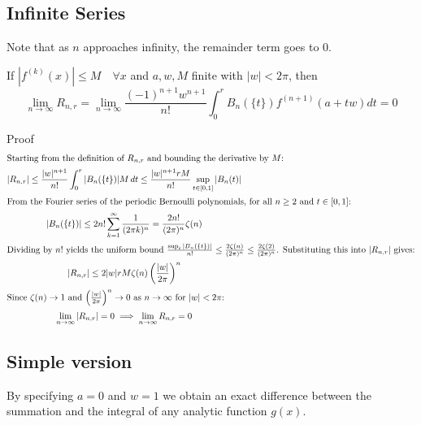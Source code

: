 \documentclass[a4paper]{article}
\begin{document}
\subsection{Infinite Series}
Note that as $n$ approaches infinity, the remainder term goes to 0.
\begin{theorem}
    If $|f^{(k)}(x)| \leq M \quad \forall x$ and $a, w, M$ finite with $|w| < 2\pi$, then
    \begin{equation}\label{dar:Inifite Euler Mac's Series}
        \boxed{
            \lim_{n \to \infty} R_{n,r} = \lim_{n \to \infty} \frac{(-1)^{n+1} w^{n+1}}{n!} \int_{0}^{r} B_n(\{t\}) f^{(n+1)}(a+tw) dt = 0
        }
    \end{equation}

    Proof
    \begin{gather*}
        \intertext{Starting from the definition of $R_{n,r}$ and bounding the derivative by $M$:}
        |R_{n,r}| \leq \frac{|w|^{n+1}}{n!} \int_{0}^{r} |B_n(\{t\})| M \, dt \leq \frac{|w|^{n+1} r M}{n!} \sup_{t \in [0, 1]} |B_n(t)|
        \\
        \intertext{From the Fourier series of the periodic Bernoulli polynomials, for all $n \geq 2$ and $t \in [0, 1]$:}
        |B_n(\{t\})| \leq 2 n! \sum_{k=1}^{\infty} \frac{1}{(2\pi k)^n} = \frac{2 n!}{(2\pi)^n} \zeta(n)
        \\
        \intertext{Dividing by $n!$ yields the uniform bound $\frac{\sup_t |B_n(\{t\})|}{n!} \leq \frac{2\zeta(n)}{(2\pi)^n} \leq \frac{2\zeta(2)}{(2\pi)^n}$. Substituting this into $|R_{n,r}|$ gives:}
        |R_{n,r}| \leq 2 |w| r M \zeta(n) \left( \frac{|w|}{2\pi} \right)^n
        \\
        \intertext{Since $\zeta(n) \to 1$ and $\left(\frac{|w|}{2\pi}\right)^n \to 0$ as $n \to \infty$ for $|w| < 2\pi$:}
        \lim_{n \to \infty} |R_{n,r}| = 0 \implies \lim_{n \to \infty} R_{n,r} = 0
    \end{gather*}
\end{theorem}


\subsection{Simple version}
By specifying $a=0$ and $w=1$ we obtain an exact difference between the summation and the integral of any analytic function $g(x)$.
\end{document}
